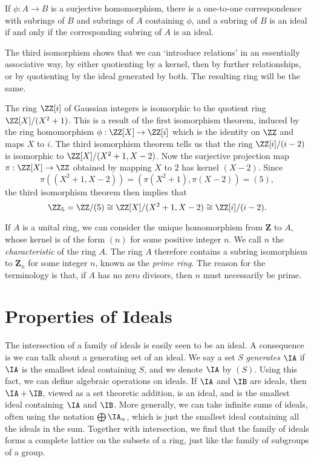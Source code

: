 \begin{theorem}
    If $\phi:A \to B$ is a surjective homomorphism, there is a one-to-one correspondence with subrings of $B$ and subrings of $A$ containing $\phi$, and a subring of $B$ is an ideal if and only if the corresponding subring of $A$ is an ideal.
\end{theorem}

The third isomorphism shows that we can `introduce relations' in an essentially associative way, by either quotienting by a kernel, then by further relationships, or by quotienting by the ideal generated by both. The resulting ring will be the same.

\begin{example}
    The ring $\ZZ[i]$ of Gaussian integers is isomorphic to the quotient ring $\ZZ[X]/(X^2 + 1)$. This is a result of the first isomorphism theorem, induced by the ring homomorphism $\phi: \ZZ[X] \to \ZZ[i]$ which is the identity on $\ZZ$ and maps $X$ to $i$. The third isomorphism theorem tells us that the ring $\ZZ[i]/(i - 2)$ is isomorphic to $\ZZ[X]/(X^2 + 1, X - 2)$. Now the surjective projection map $\pi: \ZZ[X] \to \ZZ$ obtained by mapping $X$ to $2$ has kernel $(X - 2)$. Since
    \[ \pi((X^2 + 1, X - 2)) = (\pi(X^2 + 1), \pi(X - 2)) = (5), \]
    the third isomorphism theorem then implies that
    \[ \ZZ_5 = \ZZ/(5) \cong \ZZ[X]/(X^2 + 1, X - 2) \cong \ZZ[i]/(i-2). \]
\end{example}

If $A$ is a unital ring, we can consider the unique homomorphism from $\mathbf{Z}$ to $A$, whose kernel is of the form $(n)$ for some positive integer $n$. We call $n$ the \emph{characteristic} of the ring $A$. The ring $A$ therefore contains a subring isomorphism to $\mathbf{Z}_n$ for some integer $n$, known as the \emph{prime ring}. The reason for the terminology is that, if $A$ has no zero divisors, then $n$ must necessarily be prime.

\section{Properties of Ideals}

The intersection of a family of ideals is easily seen to be an ideal. A consequence is we can talk about a generating set of an ideal. We say a set $S$ \emph{generates} $\IA$ if $\IA$ is the smallest ideal containing $S$, and we denote $\IA$ by $(S)$. Using this fact, we can define algebraic operations on ideals. If $\IA$ and $\IB$ are ideals, then $\IA + \IB$, viewed as a set theoretic addition, is an ideal, and is the smallest ideal containing $\IA$ and $\IB$. More generally, we can take infinite sums of ideals, often using the notation $\bigoplus \IA_\alpha$, which is just the smallest ideal containing all the ideals in the sum. Together with intersection, we find that the family of ideals forms a complete lattice on the subsets of a ring, just like the family of subgroups of a group.

